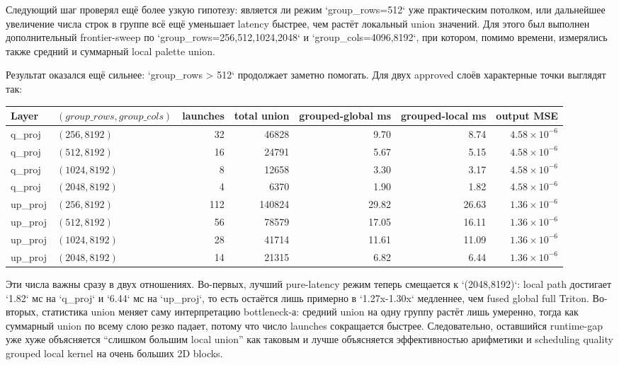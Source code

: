 Следующий шаг проверял ещё более узкую гипотезу: является ли режим
`group\_rows=512` уже практическим потолком, или дальнейшее увеличение числа
строк в группе всё ещё уменьшает latency быстрее, чем растёт локальный union
значений. Для этого был выполнен дополнительный frontier-sweep по
`group\_rows=256,512,1024,2048` и `group\_cols=4096,8192`, при котором,
помимо времени, измерялись также средний и суммарный local palette union.

Результат оказался ещё сильнее: `group\_rows > 512` продолжает заметно
помогать. Для двух approved слоёв характерные точки выглядят так:

\begin{center}
\begin{tabular}{llrrrrr}
\toprule
Layer & $(group\_rows, group\_cols)$ & launches & total union & grouped-global ms & grouped-local ms & output MSE \\
\midrule
q\_proj & $(256, 8192)$ & 32 & 46828 & 9.70 & 8.74 & $4.58 \times 10^{-6}$ \\
q\_proj & $(512, 8192)$ & 16 & 24791 & 5.67 & 5.15 & $4.58 \times 10^{-6}$ \\
q\_proj & $(1024, 8192)$ & 8 & 12658 & 3.30 & 3.17 & $4.58 \times 10^{-6}$ \\
q\_proj & $(2048, 8192)$ & 4 & 6370 & 1.90 & 1.82 & $4.58 \times 10^{-6}$ \\
up\_proj & $(256, 8192)$ & 112 & 140824 & 29.82 & 26.63 & $1.36 \times 10^{-6}$ \\
up\_proj & $(512, 8192)$ & 56 & 78579 & 17.05 & 16.11 & $1.36 \times 10^{-6}$ \\
up\_proj & $(1024, 8192)$ & 28 & 41714 & 11.61 & 11.09 & $1.36 \times 10^{-6}$ \\
up\_proj & $(2048, 8192)$ & 14 & 21315 & 6.82 & 6.44 & $1.36 \times 10^{-6}$ \\
\bottomrule
\end{tabular}
\end{center}

Эти числа важны сразу в двух отношениях. Во-первых, лучший pure-latency режим
теперь смещается к `(2048,8192)`: local path достигает `1.82` мс на `q_proj`
и `6.44` мс на `up_proj`, то есть остаётся лишь примерно в `1.27x-1.30x`
медленнее, чем fused global full Triton. Во-вторых, статистика union меняет
саму интерпретацию bottleneck-а: средний union на одну группу растёт лишь
умеренно, тогда как суммарный union по всему слою резко падает, потому что
число launches сокращается быстрее. Следовательно, оставшийся runtime-gap уже
хуже объясняется ``слишком большим local union'' как таковым и лучше
объясняется эффективностью арифметики и scheduling quality grouped local
kernel на очень больших 2D blocks.

